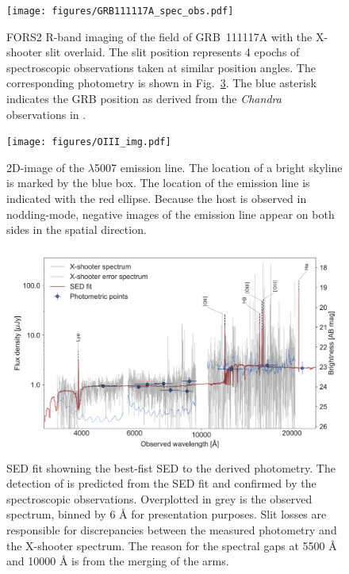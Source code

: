\documentclass{aa}    %
\begin{document}
\begin{figure}
	\centering
	\texttt{[image: figures/GRB111117A\_spec\_obs.pdf]}
	\caption{
	FORS2 R-band imaging of the field of GRB~111117A with the X-shooter slit overlaid. The slit
	position represents 4 epochs of spectroscopic observations taken at similar
	position angles. The corresponding photometry
	is shown in Fig.~\ref{fig:SED}. The blue asterisk indicates the GRB position as
	derived from the \emph{Chandra} observations in \citet{Sakamoto2013}. 
	}
	\label{fig:spec_setup}
\end{figure}

\begin{figure}
	\centering
	\texttt{[image: figures/OIII\_img.pdf]}
	\caption{2D-image of the \oiii$\lambda$5007 emission line. The location of a bright skyline is marked by the blue box. The location of the emission line is indicated with the red ellipse. Because the host is observed in nodding-mode, negative images of the emission line appear on both sides in the spatial direction.}
	\label{fig:line}
\end{figure}


\begin{figure}
	\centering
	\includegraphics[width=16cm]{figures/SEDspecphot.pdf}
	\caption{SED fit showning the best-fist SED to the derived photometry. The detection of \lya{}  is predicted from the SED fit and confirmed by the spectroscopic observations. Overplotted in grey is the observed spectrum, binned by 6 \AA{} for presentation purposes. Slit losses are responsible for discrepancies between the measured photometry and the X-shooter spectrum. The reason for the spectral gaps at 5500 \AA{} and 10000 \AA{} is from the merging of the arms.}
	\label{fig:SED}
\end{figure}
\end{document}
